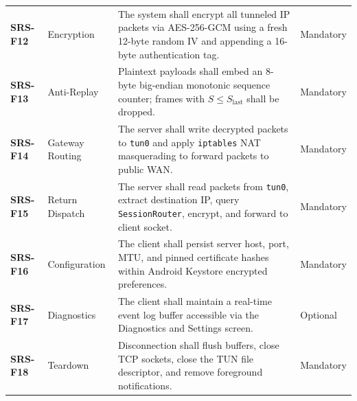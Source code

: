 \begin{longtable}{@{}P{1.8cm}P{3.4cm}P{6.4cm}P{2.4cm}@{}}
  \addlinespace
  \textbf{SRS-F12} & Encryption & The system shall encrypt all tunneled IP packets via AES-256-GCM using a fresh 12-byte random IV and appending a 16-byte authentication tag. & Mandatory \\
  \addlinespace
  \textbf{SRS-F13} & Anti-Replay & Plaintext payloads shall embed an 8-byte big-endian monotonic sequence counter; frames with $S \le S_{\text{last}}$ shall be dropped. & Mandatory \\
  \addlinespace
  \textbf{SRS-F14} & Gateway Routing & The server shall write decrypted packets to \texttt{tun0} and apply \texttt{iptables} NAT masquerading to forward packets to public WAN. & Mandatory \\
  \addlinespace
  \textbf{SRS-F15} & Return Dispatch & The server shall read packets from \texttt{tun0}, extract destination IP, query \texttt{SessionRouter}, encrypt, and forward to client socket. & Mandatory \\
  \addlinespace
  \textbf{SRS-F16} & Configuration & The client shall persist server host, port, MTU, and pinned certificate hashes within Android Keystore encrypted preferences. & Mandatory \\
  \addlinespace
  \textbf{SRS-F17} & Diagnostics & The client shall maintain a real-time event log buffer accessible via the Diagnostics and Settings screen. & Optional \\
  \addlinespace
  \textbf{SRS-F18} & Teardown & Disconnection shall flush buffers, close TCP sockets, close the TUN file descriptor, and remove foreground notifications. & Mandatory \\
\end{longtable}
